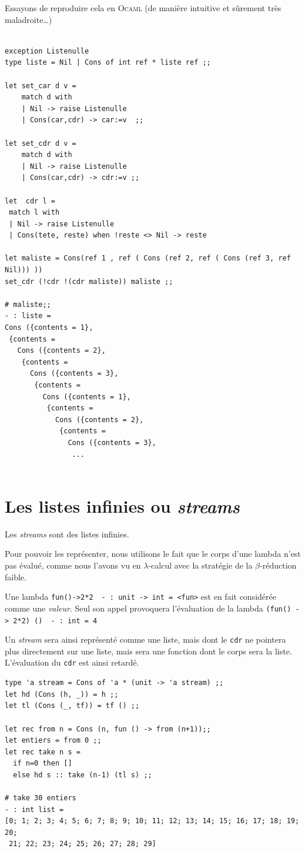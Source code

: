 Essayons de reproduire cela en \textsc{Ocaml}
(de manière intuitive et sûrement très maladroite\ldots)
\begin{verbatim}

exception Listenulle
type liste = Nil | Cons of int ref * liste ref ;;

let set_car d v =
	match d with
	| Nil -> raise Listenulle
	| Cons(car,cdr) -> car:=v  ;;
	
let set_cdr d v =
	match d with
	| Nil -> raise Listenulle
	| Cons(car,cdr) -> cdr:=v ;;
	
let  cdr l =
 match l with
 | Nil -> raise Listenulle
 | Cons(tete, reste) when !reste <> Nil -> reste

let maliste = Cons(ref 1 , ref ( Cons (ref 2, ref ( Cons (ref 3, ref Nil))) ))
set_cdr (!cdr !(cdr maliste)) maliste ;;

# maliste;;
- : liste =
Cons ({contents = 1},
 {contents =
   Cons ({contents = 2},
    {contents =
      Cons ({contents = 3},
       {contents =
         Cons ({contents = 1},
          {contents =
            Cons ({contents = 2},
             {contents =
               Cons ({contents = 3},
               	...
               	
\end{verbatim}

\section{Les listes infinies ou \textit{streams}}	
Les \textit{streams} sont des listes infinies.

Pour pouvoir les représenter, nous utilisons le fait que le corps d'une lambda n'est pas évalué, 
comme nous l'avons vu en $\lambda$-calcul avec la
stratégie de la $\beta$-réduction faible.


Une lambda \texttt{fun()->2*2}\ \imp\ \texttt{- : unit -> int = <fun>} est en fait considérée 
comme une \textit{valeur}. Seul son appel provoquera l'évaluation de la lambda
\texttt{(fun() -> 2*2) ()}\ \imp\  \texttt{- : int = 4}

Un \textit{stream} sera ainsi représenté comme une liste, mais dont le \verb+cdr+ ne pointera plus directement 
sur une liste, mais sera une fonction dont le corps sera la liste. L'évaluation du \verb+cdr+ est ainsi retardé.
 
\begin{verbatim}
type 'a stream = Cons of 'a * (unit -> 'a stream) ;;
let hd (Cons (h, _)) = h ;;
let tl (Cons (_, tf)) = tf () ;;

let rec from n = Cons (n, fun () -> from (n+1));;
let entiers = from 0 ;;
let rec take n s =
  if n=0 then []
  else hd s :: take (n-1) (tl s) ;;

# take 30 entiers
- : int list =
[0; 1; 2; 3; 4; 5; 6; 7; 8; 9; 10; 11; 12; 13; 14; 15; 16; 17; 18; 19; 20;
 21; 22; 23; 24; 25; 26; 27; 28; 29]
\end{verbatim}

